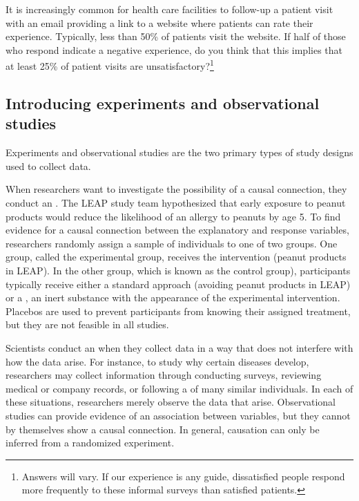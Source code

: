 \begin{exercise}
It is increasingly common for health care facilities to follow-up a patient visit with an email providing a link to a website where patients can rate their experience.  Typically, less than 50\% of patients visit the website.  If half of those who respond indicate a negative experience, do you think that this implies that at least 25\% of patient visits are unsatisfactory?\footnote{Answers will vary. If our experience is any guide, dissatisfied people respond more frequently to these informal surveys than satisfied patients.}
\end{exercise}


\subsection{Introducing experiments and observational studies}

Experiments and observational studies are the two primary types of study designs used to collect data.

When researchers want to investigate the possibility of a causal connection, they conduct an . The LEAP study team hypothesized that early exposure to peanut products would reduce the likelihood of an allergy to peanuts by age 5. To find evidence for a causal connection between the explanatory and response variables, researchers randomly assign a sample of individuals to one of two groups.  One group, called the experimental group, receives the intervention (peanut products in LEAP). In the other group, which is known as the control group), participants typically receive either a standard approach (avoiding peanut products in LEAP) or a , an inert substance with the appearance of the experimental intervention.  Placebos are used to prevent participants from knowing their assigned treatment, but they are not feasible in all studies.

Scientists conduct an  when they collect data in a way that does not interfere with how the data arise. For instance, to study why certain diseases develop, researchers may collect information through conducting surveys, reviewing medical or company records, or following a  of many similar individuals. In each of these situations, researchers merely observe the data that arise. Observational studies can provide evidence of an association between variables, but they cannot by themselves show a causal connection. In general, causation can only be inferred from a randomized experiment.

